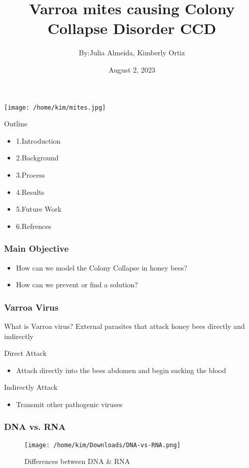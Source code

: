\documentclass{beamer}
\title{Varroa mites causing Colony Collapse Disorder CCD}
\author{By:Julia Almeida, Kimberly Ortiz}
\institute{Institue for Computing in Research}
\date{August 2, 2023}
\begin{document}
{
\texttt{[image: /home/kim/mites.jpg]}
}

\begin{frame}
  \titlepage
\end{frame}

\begin{frame}{Outline}{\large}
\begin{itemize}
    \item 1.Introduction
    \item 2.Background
    \item 3.Process
    \item 4.Results
    \item 5.Future Work
    \item 6.Refrences
\end{itemize}
\end{frame}

\begin{frame}
  \frametitle{Main Objective}
  \begin{itemize}
  \item How can we model the Colony Collapse in honey bees?
  \item How can we prevent or find a solution?
  \end{itemize}
\end{frame}

\begin{frame}
  \frametitle{Varroa Virus}
What is Varroa virus?
\linebreak
External parasites that attack honey bees directly and indirectly

  Direct Attack
  \begin{itemize}
  \item Attach directly into the bees abdomen and begin sucking the blood
  \end{itemize}

  Indirectly Attack
  \begin{itemize}
  \item Transmit other pathogenic viruses
  \end{itemize}
\end{frame}

\begin{frame}
  \frametitle{DNA vs. RNA}

  \begin{figure}
  \centering
      \texttt{[image: /home/kim/Downloads/DNA-vs-RNA.png]}
      \caption{Differences between DNA \& RNA}
      \label{DNA&RNA}
  \centering 
  \end{figure}
\end{frame}
\end{document}

